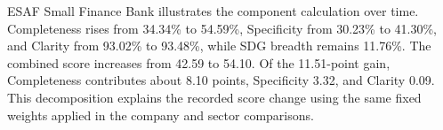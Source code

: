 ESAF Small Finance Bank illustrates the component calculation over time. Completeness rises from 34.34\% to 54.59\%, Specificity from 30.23\% to 41.30\%, and Clarity from 93.02\% to 93.48\%, while SDG breadth remains 11.76\%. The combined score increases from 42.59 to 54.10. Of the 11.51-point gain, Completeness contributes about 8.10 points, Specificity 3.32, and Clarity 0.09. This decomposition explains the recorded score change using the same fixed weights applied in the company and sector comparisons.

